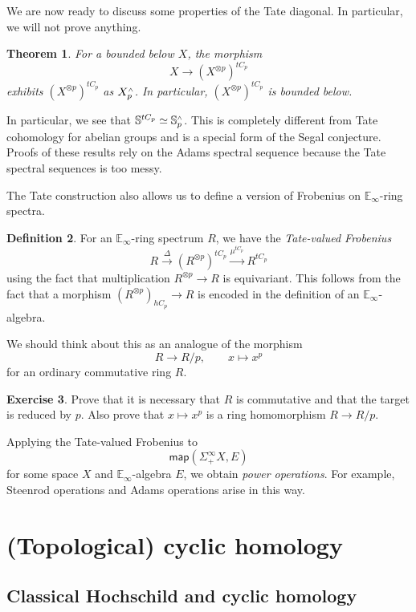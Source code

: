 \documentclass[10pt, oneside]{memoir}
\newtheorem{thm}{Theorem}[subsection]
\theoremstyle{definition}
\newtheorem{defn}[thm]{Definition}
\newtheorem{exer}[thm]{Exercise}
\theoremstyle{remark}
\theoremstyle{plain}
\theoremstyle{definition}
\theoremstyle{remark}
\newcommand{\E}{\mathbb{E}}
\newcommand{\bS}{\mathbb{S}}
\newcommand{\ms}[1]{\mathsf{#1}}
\newcommand{\1}{\mathbf{1}}
\newcommand{\2}{\mathbf{2}}
\newcommand{\3}{\mathbf{3}}
\newcommand{\sw}{\mathsmaller{\wedge}}
\begin{document}
We are now ready to discuss some properties of the Tate diagonal. In particular, we will not prove anything.

\begin{thm}
    For a bounded below \(X \), the morphism
    \[ X \to (X^{\otimes p})^{t C_p} \]
    exhibits \((X^{\otimes p})^{t C_p} \) as \(X_p^{\sw} \). In particular, \((X^{\otimes p})^{t C_p} \) is bounded below.
\end{thm}

In particular, we see that \(\bS^{t C_p} \simeq \bS_p^{\sw} \). This is completely different from Tate cohomology for abelian groups and is a special form of the Segal conjecture. Proofs of these results rely on the Adams spectral sequence because the Tate spectral sequences is too messy.

The Tate construction also allows us to define a version of Frobenius on \(\E_{\infty} \)-ring spectra.
\begin{defn}
    For an \(\E_{\infty} \)-ring spectrum \(R \), we have the \textit{Tate-valued Frobenius}
    \[ R \xrightarrow{\Delta} (R^{\otimes p})^{t C_p} \xrightarrow{\mu^{t C_p}} R^{t C_p} \]
    using the fact that multiplication \(R^{\otimes p} \to R \) is equivariant. This follows from the fact that a morphism \((R^{\otimes p})_{h C_p} \to R \) is encoded in the definition of an \(\E_{\infty} \)-algebra.
\end{defn}

We should think about this as an analogue of the morphism
\[ R \to R/p, \qquad x \mapsto x^p \]
for an ordinary commutative ring \(R \).

\begin{exer}
    Prove that it is necessary that \(R \) is commutative and that the target is reduced by \(p \). Also prove that \(x \mapsto x^p \) is a ring homomorphism \(R \to R/p \).
\end{exer}

Applying the Tate-valued Frobenius to
\[ \ms{map}(\Sigma_+^{\infty} X, E) \]
for some space \(X \) and \(\E_{\infty} \)-algebra \(E \), we obtain \textit{power operations}. For example, Steenrod operations and Adams operations arise in this way.



\chapter{(Topological) cyclic homology}\thispagestyle{firstpage}
\section{Classical Hochschild and cyclic homology}%
\label{sec:Classical Hochschild and cyclic homology}
\end{document}
